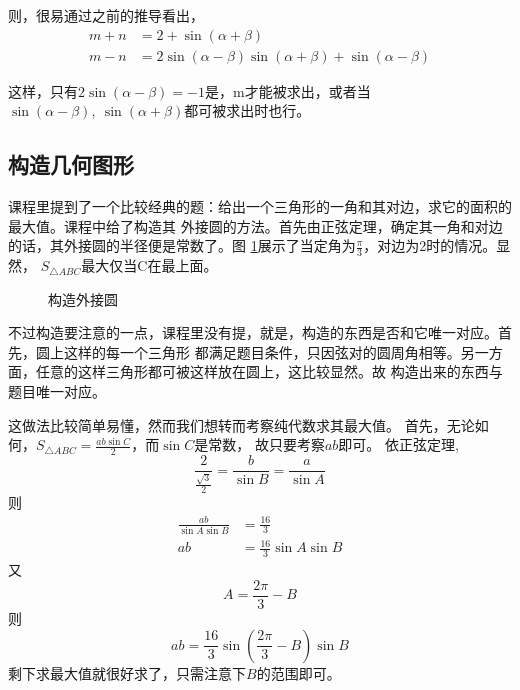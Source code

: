 则，很易通过之前的推导看出，
\begin{align*}
m + n &= 2 + \sin{(\alpha + \beta)} \\
m - n &= 2\sin{(\alpha - \beta)}\sin{(\alpha + \beta)} + \sin{(\alpha - \beta)}
\end{align*}

这样，只有\(2\sin{(\alpha - \beta)} = -1\)是，m才能被求出，或者当\\
\(\sin{(\alpha - \beta)},\ \sin{(\alpha + \beta)}\)都可被求出时也行。

\subsection{构造几何图形}
课程里提到了一个比较经典的题：给出一个三角形的一角和其对边，求它的面积的最大值。课程中给了构造其
外接圆的方法。首先由正弦定理，确定其一角和对边的话，其外接圆的半径便是常数了。图
\ref{fig:ConstructGeometry}展示了当定角为$\frac{\pi}{3}$，对边为2时的情况。显然，
\(S_{\triangle ABC}\)最大仅当C在最上面。

\begin{figure}[!hbtp]
\begin{center}
\end{center}
\caption{构造外接圆}
\label{fig:ConstructGeometry}
\end{figure}

不过构造要注意的一点，课程里没有提，就是，构造的东西是否和它唯一对应。首先，圆上这样的每一个三角形
都满足题目条件，只因弦对的圆周角相等。另一方面，任意的这样三角形都可被这样放在圆上，这比较显然。故
构造出来的东西与题目唯一对应。

这做法比较简单易懂，然而我们想转而考察纯代数求其最大值。
首先，无论如何，\(S_{\triangle ABC} = \frac{ab\sin{C}}{2}\)，而\(\sin{C}\)是常数，
故只要考察$ab$即可。
依正弦定理,
\begin{equation}
\frac{2}{\frac{\sqrt{3}}{2}} = \frac{b}{\sin{B}} = \frac{a}{\sin{A}}
\end{equation}
则
\begin{align*}
\frac{ab}{\sin{A}\sin{B}} &= \frac{16}{3} \\
ab &= \frac{16}{3}\sin{A}\sin{B}
\end{align*}
又
\[
A = \frac{2\pi}{3} - B
\]
则
\begin{equation}
ab = \frac{16}{3}\sin{(\frac{2\pi}{3} - B)}\sin{B}
\end{equation}
剩下求最大值就很好求了，只需注意下$B$的范围即可。

